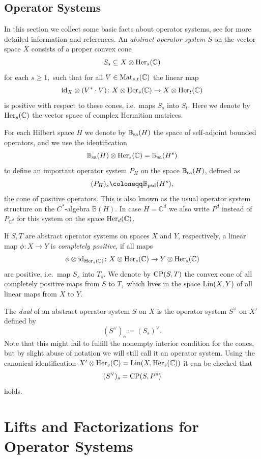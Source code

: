 \documentclass[11pt,onecolumn]{article}
\theoremstyle{plain}
\theoremstyle{definition}
\begin{document}
\subsection{Operator Systems}
In this section we collect some basic facts about operator systems, see \cite{pau} for more detailed information and references.
An \textit{abstract operator system} $S$ on the vector space $X$ consists of a proper convex cone $$S_s\subseteq X\otimes {\rm Her}_s(\mathbb C)$$ for each $s\geqslant 1,$ such that for all $V\in{\rm Mat}_{s,t}(\mathbb C)$ the linear map $${\rm id}_X\otimes (V^*\cdot V) \colon X\otimes {\rm Her}_s(\mathbb C)\to X\otimes{\rm Her}_t(\mathbb C)$$ is positive with respect to these cones, i.e.\ maps $S_s$ into $S_t$.  Here we denote by ${\rm Her}_s(\mathbb C)$ the vector space of complex Hermitian matrices.

For each Hilbert space $H$ we denote by $\mathbb B_{\rm sa}(H)$ the space of self-adjoint bounded operators, and we use the identification $$\mathbb B_{\rm sa}(H)\otimes{\rm Her}_s(\mathbb C)=\mathbb B_{\rm sa}(H^s)$$ to define an important  operator system $P_H$ on the space $\mathbb B_{\rm sa}(H)$, defined as $$(P_H)_s\coloneqq \mathbb B_{\rm psd}(H^s),$$ the cone of positive operators. This is also known as the usual operator system structure on the $C^*$-algebra $\mathbb B(H)$. In case $H=\mathbb C^d$ we also write $P^d$ instead of $P_{\mathbb C^d}$ for this system on the space ${\rm Her}_d(\mathbb C)$.

If $S,T$ are abstract operator systems on spaces $X$ and $Y$, respectively,  a linear map $\phi\colon X\to Y$ is \emph{completely positive}, if all maps $$\phi\otimes{\rm id}_{{\rm Her}_s(\mathbb C)}\colon X\otimes{\rm Her}_s(\mathbb C)\to Y\otimes{\rm Her}_s(\mathbb C)$$ are positive, i.e.\ map $S_s$ into $T_s.$ We denote by ${\rm CP}(S,T)$ the convex cone of all completely positive maps from $S$ to $T,$ which lives in the space ${\rm Lin}(X,Y)$ of all linear maps from $X$ to $Y$.

The \textit{dual} of an abstract operator system \(S\) on $X$ is the operator system \(S^\lor\) on $X'$ defined by 
$$(S^\vee)_s\coloneqq (S_s)^\vee.$$  Note that this might fail to fulfill the nonempty interior condition for the cones, but by slight abuse of notation  we will still call it an operator system. Using the canonical identification 
 $X'\otimes{\rm Her}_s(\mathbb C)={\rm Lin}(X,{\rm Her}_s(\mathbb C))$ it can be checked that $$(S^\vee)_s={\rm CP}(S,P^{s})$$ holds. 

\section{Lifts and Factorizations for Operator Systems}
\label{sec:results}
\end{document}
